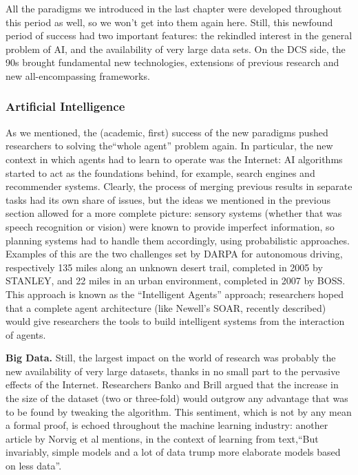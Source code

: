 \documentclass[../main.tex]{subfiles}
\begin{document}
All the paradigms we introduced in the last chapter were developed throughout this period as well, so we won't get into them again here. Still, this newfound period of success had two important features: the rekindled interest in the general problem of AI, and the availability of very large data sets. On the DCS side, the 90s brought fundamental new technologies, extensions of previous research and new all-encompassing frameworks.

\subsubsection{Artificial Intelligence}
As we mentioned, the (academic, first) success of the new paradigms pushed researchers to solving the``whole agent'' problem again. In particular, the new context in which agents had to learn to operate was the Internet: AI algorithms started to act as the foundations behind, for example, search engines and recommender systems. Clearly, the process of merging previous results in separate tasks had its own share of issues, but the ideas we mentioned in the previous section allowed for a more complete picture: sensory systems (whether that was speech recognition or vision) were known to provide imperfect information, so planning systems had to handle them accordingly, using probabilistic approaches. Examples of this are the two challenges set by DARPA for autonomous driving, respectively 135 miles along an unknown desert trail, completed in 2005 by STANLEY, and 22 miles in an urban environment, completed in 2007 by BOSS. This approach is known as the ``Intelligent Agents'' approach; researchers hoped that a complete agent architecture (like Newell's SOAR, recently described\cite{pressSoarCognitiveArchitecture2012}) would give researchers the tools to build intelligent systems from the interaction of agents.

\vspace{4pt}
\textbf{Big Data.} Still, the largest impact on the world of research was probably the new availability of very large datasets, thanks in no small part to the pervasive effects of the Internet. Researchers Banko and Brill\cite{bankoScalingVeryVery2001} argued that the increase in the size of the dataset (two or three-fold) would outgrow any advantage that was to be found by tweaking the algorithm. This sentiment, which is not by any mean a formal proof, is echoed throughout the machine learning industry: another article by Norvig et al mentions, in the context of learning from text,\enquote{But invariably, simple models and a lot of data trump more elaborate models based on less data}\cite{halevyUnreasonableEffectivenessData2009}.
\end{document}
